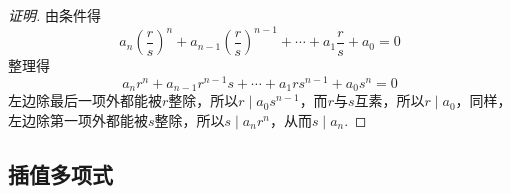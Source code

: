 \begin{proof}[证明]
  由条件得
  \[ a_n \left( \frac{r}{s} \right)^{n} + a_{n-1}\left( \frac{r}{s} \right)^{n-1} + \cdots + a_1 \frac{r}{s} + a_0 = 0 \]
  整理得
  \[ a_nr^n + a_{n-1}r^{n-1}s + \cdots + a_1rs^{n-1} + a_0s^n = 0 \]
  左边除最后一项外都能被$r$整除，所以$r \mid a_0s^{n-1}$，而$r$与$s$互素，所以$r \mid a_0$，同样，左边除第一项外都能被$s$整除，所以$s \mid a_nr^n$，从而$s \mid a_n$.
\end{proof}

\subsection{插值多项式}
\label{sec:interpolation-polynome}






